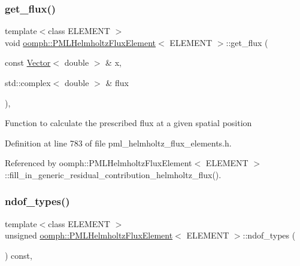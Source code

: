 \subsubsection{\texorpdfstring{get\+\_\+flux()}{get\_flux()}}
{\footnotesize\ttfamily template$<$class E\+L\+E\+M\+E\+NT $>$ \\
void \hyperlink{classoomph_1_1PMLHelmholtzFluxElement}{oomph\+::\+P\+M\+L\+Helmholtz\+Flux\+Element}$<$ E\+L\+E\+M\+E\+NT $>$\+::get\+\_\+flux (\begin{DoxyParamCaption}\item[{const \hyperlink{classoomph_1_1Vector}{Vector}$<$ double $>$ \&}]{x,  }\item[{std\+::complex$<$ double $>$ \&}]{flux }\end{DoxyParamCaption})\hspace{0.3cm}{\ttfamily [inline]}, {\ttfamily [protected]}}

Function to calculate the prescribed flux at a given spatial position 

Definition at line 783 of file pml\+\_\+helmholtz\+\_\+flux\+\_\+elements.\+h.



Referenced by oomph\+::\+P\+M\+L\+Helmholtz\+Flux\+Element$<$ E\+L\+E\+M\+E\+N\+T $>$\+::fill\+\_\+in\+\_\+generic\+\_\+residual\+\_\+contribution\+\_\+helmholtz\+\_\+flux().

\mbox{\label{classoomph_1_1PMLHelmholtzFluxElement_a9a872ad9cdfe2400f2be301c7fd84e86}} 
\subsubsection{\texorpdfstring{ndof\+\_\+types()}{ndof\_types()}}
{\footnotesize\ttfamily template$<$class E\+L\+E\+M\+E\+NT $>$ \\
unsigned \hyperlink{classoomph_1_1PMLHelmholtzFluxElement}{oomph\+::\+P\+M\+L\+Helmholtz\+Flux\+Element}$<$ E\+L\+E\+M\+E\+NT $>$\+::ndof\+\_\+types (\begin{DoxyParamCaption}{ }\end{DoxyParamCaption}) const\hspace{0.3cm}{\ttfamily [inline]}, {\ttfamily [virtual]}}



